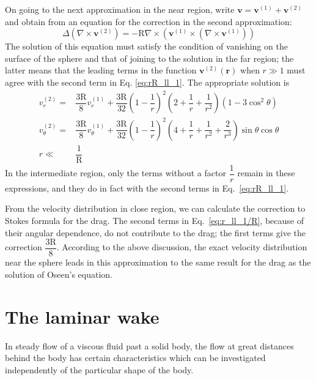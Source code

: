 \documentclass[conference]{IEEEtran}
\theoremstyle{definition}
\theoremstyle{remark}
\begin{document}
    On going to the next approximation in the near region, write $\mathbf{v} = \mathbf{v}^{(1)} + \mathbf{v}^{(2)}$ and obtain from an equation for the correction in the second approximation:
    \begin{equation}
        \Delta (\nabla \times \mathbf{v}^{(2)}) = - \mathrm{R} \nabla \times (\mathbf{v}^{(1)} \times (\nabla \times \mathbf{v}^{(1)}))
    \end{equation}
    The solution of this equation must satisfy the condition of vanishing on the surface of the sphere and that of joining to the solution in the far region; the latter means that the leading terms in the function $\mathbf{v}^{(2)}(\mathbf{r})$ when $r \gg 1$ must agree with the second term in Eq. \ref{eq:rR_ll_1}. The appropriate solution is
    \begin{align}
        v_r^{(2)} =& \dfrac{3\mathrm{R}}{8} v_r^{(1)} + \dfrac{3\mathrm{R}}{32} \left( 1 - \dfrac1r \right)^2 \left( 2 + \dfrac1r + \dfrac1{r^2} \right) (1 - 3\cos^2 \theta) \nonumber \\
        v_\theta^{(2)} =& \dfrac{3\mathrm{R}}{8} v_\theta^{(1)} + \dfrac{3\mathrm{R}}{32} \left( 1 - \dfrac1r \right)^2 \left( 4 + \dfrac1r + \dfrac1{r^2} + \dfrac2{r^3} \right) \sin\theta\cos\theta \nonumber \\
        r \ll & \dfrac1{\mathrm{R}}
        \label{eq:r_ll_1/R}
    \end{align}
    In the intermediate region, only the terms without a factor $\dfrac1r$ remain in these expressions, and they do in fact with the second terms in Eq.~\ref{eq:rR_ll_1}.

    From the velocity distribution in close region, we can calculate the correction to Stokes formula for the drag. The second terms in Eq.~\ref{eq:r_ll_1/R}, because of their angular dependence, do not contribute to the drag; the first terms give the correction $\dfrac{3\mathrm{R}}8$. According to the above discussion, the exact velocity distribution near the sphere leads in this approximation to the same result for the drag as the solution of Oseen's equation.

    \section{The laminar wake}
    In steady flow of a viscous fluid past a solid body, the flow at great distances behind the body has certain characteristics which can be investigated independently of the particular shape of the body.
\end{document}
